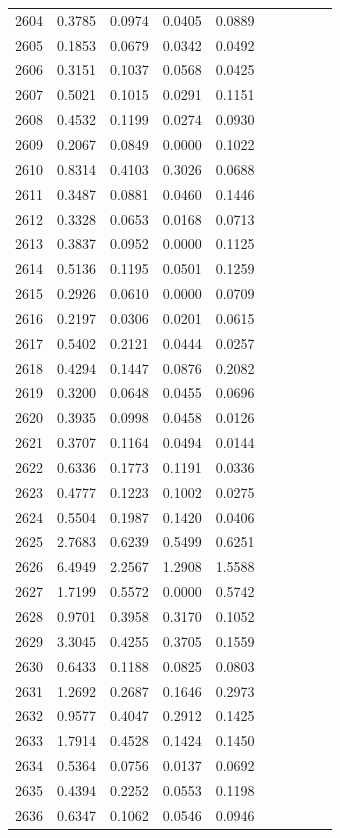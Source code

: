 \begin{table}
\begin{tabular}{cccccccccc}
2604& 0.3785& 0.0974& 0.0405& 0.0889\\ 
2605& 0.1853& 0.0679& 0.0342& 0.0492\\ 
2606& 0.3151& 0.1037& 0.0568& 0.0425\\ 
2607& 0.5021& 0.1015& 0.0291& 0.1151\\ 
2608& 0.4532& 0.1199& 0.0274& 0.0930\\ 
2609& 0.2067& 0.0849& 0.0000& 0.1022\\ 
2610& 0.8314& 0.4103& 0.3026& 0.0688\\ 
2611& 0.3487& 0.0881& 0.0460& 0.1446\\ 
2612& 0.3328& 0.0653& 0.0168& 0.0713\\ 
2613& 0.3837& 0.0952& 0.0000& 0.1125\\ 
2614& 0.5136& 0.1195& 0.0501& 0.1259\\ 
2615& 0.2926& 0.0610& 0.0000& 0.0709\\ 
2616& 0.2197& 0.0306& 0.0201& 0.0615\\ 
2617& 0.5402& 0.2121& 0.0444& 0.0257\\ 
2618& 0.4294& 0.1447& 0.0876& 0.2082\\ 
2619& 0.3200& 0.0648& 0.0455& 0.0696\\ 
2620& 0.3935& 0.0998& 0.0458& 0.0126\\ 
2621& 0.3707& 0.1164& 0.0494& 0.0144\\ 
2622& 0.6336& 0.1773& 0.1191& 0.0336\\ 
2623& 0.4777& 0.1223& 0.1002& 0.0275\\ 
2624& 0.5504& 0.1987& 0.1420& 0.0406\\ 
2625& 2.7683& 0.6239& 0.5499& 0.6251\\ 
2626& 6.4949& 2.2567& 1.2908& 1.5588\\ 
2627& 1.7199& 0.5572& 0.0000& 0.5742\\ 
2628& 0.9701& 0.3958& 0.3170& 0.1052\\ 
2629& 3.3045& 0.4255& 0.3705& 0.1559\\ 
2630& 0.6433& 0.1188& 0.0825& 0.0803\\ 
2631& 1.2692& 0.2687& 0.1646& 0.2973\\ 
2632& 0.9577& 0.4047& 0.2912& 0.1425\\ 
2633& 1.7914& 0.4528& 0.1424& 0.1450\\ 
2634& 0.5364& 0.0756& 0.0137& 0.0692\\ 
2635& 0.4394& 0.2252& 0.0553& 0.1198\\ 
2636& 0.6347& 0.1062& 0.0546& 0.0946\\ 

\end{tabular}
\end{table}
